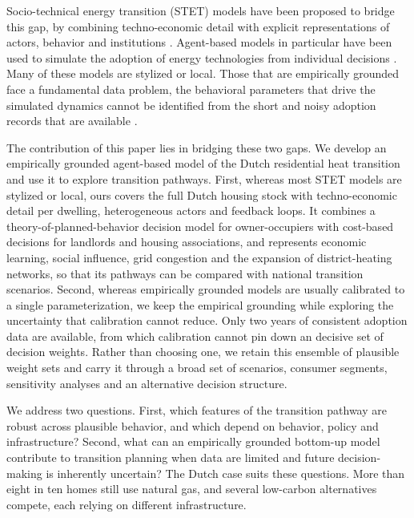 \documentclass[preprint,12pt,authoryear]{elsarticle}
\begin{document}
Socio-technical energy transition (STET) models have been proposed to bridge
this gap, by combining techno-economic detail with explicit representations
of actors, behavior and institutions
\citep{liReviewSociotechnicalEnergy2015a,hirtReviewLinkingModels2020,
trutnevyteSocietalTransformationsModels2019}. Agent-based models in
particular have been used to simulate the adoption of energy technologies
from individual decisions \citep{raiAgentbasedModelingEnergy2015,
kieslingAgentbasedSimulationInnovation2012,
mogliaReviewAgentBasedModelling2017}. Many of these models are stylized or
local. Those that are empirically grounded face a fundamental data problem,
the behavioral parameters that drive the simulated dynamics cannot be
identified from the short and noisy adoption records that are available
\citep{holtzProspectsModellingSocietal2015,mcdowallTenChallengesComputer2017,
kohlerModellingSustainabilityTransitions2018}.

The contribution of this paper lies in bridging these two gaps. We develop an
empirically grounded agent-based model of the Dutch residential heat
transition and use it to explore transition pathways.
First, whereas most STET models are stylized or local, ours covers the full
Dutch housing stock with techno-economic detail per dwelling, heterogeneous
actors and feedback loops. It combines a theory-of-planned-behavior decision
model for owner-occupiers \citep{okurAdoptionRenewableHeating2024} with
cost-based decisions for landlords and housing associations, and represents
economic learning, social influence, grid congestion and the expansion of
district-heating networks, so that its pathways can be compared with national
transition scenarios. 
Second, whereas empirically grounded models are usually
calibrated to a single parameterization, we keep the empirical grounding
while exploring the uncertainty that calibration cannot reduce. Only two
years of consistent adoption data are available, from which calibration 
cannot pin down an decisive set of decision weights. Rather than
choosing one, we retain this ensemble of plausible weight sets and carry it
through a broad set of scenarios, consumer segments, sensitivity analyses and
an alternative decision structure.

We address two questions. First, which features of the transition pathway are
robust across plausible behavior, and which depend on behavior, policy and
infrastructure? Second, what can an empirically grounded bottom-up model
contribute to transition planning when data are limited and future
decision-making is inherently uncertain? The Dutch case suits these
questions. More than eight in ten homes still use natural gas, and several
low-carbon alternatives compete, each relying on different infrastructure.
\end{document}
